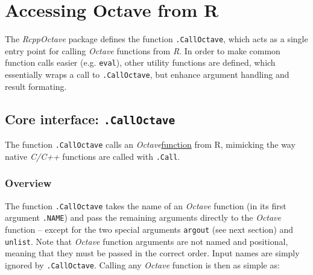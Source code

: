 \documentclass[english,10pt,a4paper]{article}\usepackage[]{graphicx}\usepackage[]{color}
\let\proglang=\textit
\let\code=\texttt
\newcommand{\pkgname}[1]{\textit{#1}\xspace}
\newcommand{\Rpkg}[1]{\pkgname{#1} package\xspace}
\newcommand{\octave}{\proglang{Octave}\xspace}
\begin{document}
\section{Accessing Octave from R}

The \Rpkg{RcppOctave} defines the function \code{.CallOctave}, which acts as a
single entry point for calling \octave functions from \proglang{R}.
In order to make common function calls easier (e.g. \code{eval}), other utility
functions are defined, which essentially wraps a call to \code{.CallOctave}, but
enhance argument handling and result formating.

\subsection{Core interface: \texttt{.CallOctave}}
The function \code{.CallOctave} calls an \octave \underline{function}
from R, mimicking the way native \proglang{C/C++} functions are called with
\code{.Call}.

\subsubsection{Overview}

The function \code{.CallOctave} takes the name of an \octave function (in its
first argument \code{.NAME}) and pass the remaining arguments directly to the
\octave function -- except for the two special arguments \code{argout} (see next
section) and \code{unlist}.
Note that \octave function arguments are not named and positional, meaning that
they must be passed in the correct order.
Input names are simply ignored by \code{.CallOctave}.
Calling any \octave function is then as simple as: 
\end{document}

